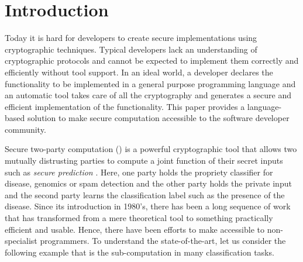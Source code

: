   

\section{Introduction}
\label{sec:intro}

Today it is hard for developers to create secure implementations using cryptographic techniques.
Typical developers lack an understanding of cryptographic protocols
and cannot be expected to implement them correctly and efficiently without tool
support.
In an ideal world, a developer declares the functionality to be implemented
in a general purpose programming language and an automatic tool takes care
of all the cryptography and generates a secure and efficient implementation  of the functionality. 
This paper provides a language-based solution to make
secure  computation  accessible to the software developer community. 



Secure two-party computation (\mpc) \cite{yao,gmw} is a powerful
cryptographic tool that allows two mutually distrusting parties
to compute a joint function of their secret inputs such as {\em secure prediction} \cite{shafindss,wu,barni,minionn,secureml}. Here,  one party holds the propriety classifier for disease, genomics or spam detection and the other party  
holds the private input and the second party learns the classification label such as the presence of the disease. Since its introduction
\mpc in 1980's, there has been a long sequence of work that has
transformed \mpc from a mere theoretical tool to something practically
efficient and usable. Hence, there have been efforts to make \mpc
accessible to non-specialist programmers. To understand the
state-of-the-art, let us consider the following 
example that is the sub-computation in many classification tasks.

